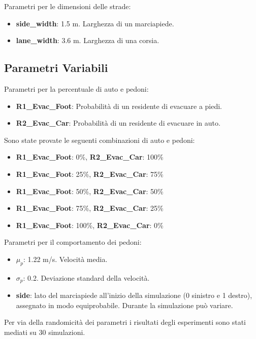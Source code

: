 \noindent
Parametri per le dimensioni delle strade:
\begin{itemize}
  \item \textbf{side\_width}: 1.5 m. Larghezza di un marciapiede.
  \item \textbf{lane\_width}: 3.6 m. Larghezza di una corsia.
\end{itemize}

\subsection{Parametri Variabili}

Parametri per la percentuale di auto e pedoni:
\begin{itemize}
  \item \textbf{R1\_Evac\_Foot}: Probabilità di un residente di evacuare a piedi.
  \item \textbf{R2\_Evac\_Car}: Probabilità di un residente di evacuare in auto.
\end{itemize}

\noindent
Sono state provate le seguenti combinazioni di auto e pedoni:
\begin{itemize}
  \item \textbf{R1\_Evac\_Foot}: 0\%, \textbf{R2\_Evac\_Car}: 100\%
  \item \textbf{R1\_Evac\_Foot}: 25\%, \textbf{R2\_Evac\_Car}: 75\%
  \item \textbf{R1\_Evac\_Foot}: 50\%, \textbf{R2\_Evac\_Car}: 50\%
  \item \textbf{R1\_Evac\_Foot}: 75\%, \textbf{R2\_Evac\_Car}: 25\%
  \item \textbf{R1\_Evac\_Foot}: 100\%, \textbf{R2\_Evac\_Car}: 0\%
\end{itemize}

\noindent
Parametri per il comportamento dei pedoni:
\begin{itemize}
  \item \textbf{$\mu_p$}: 1.22 m/s. Velocità media.
  \item \textbf{$\sigma_p$}: 0.2. Deviazione standard della velocità.
  \item \textbf{side}: lato del marciapiede all'inizio della simulazione (0 sinistro e 1 destro), assegnato in modo equiprobabile. 
  Durante la simulazione può variare. 
\end{itemize}

\noindent
Per via della randomicità dei parametri i risultati degli esperimenti sono stati mediati su 30 simulazioni.
